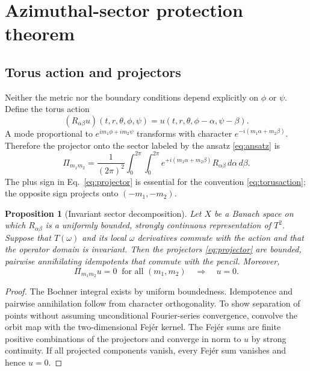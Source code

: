 \documentclass[10pt]{article}
\theoremstyle{plain}
\newtheorem{proposition}{Proposition}
\begin{document}
\section{Azimuthal-sector protection theorem}

\subsection{Torus action and projectors}

Neither the metric nor the boundary conditions depend explicitly on $\phi$ or
$\psi$. Define the torus action
\begin{equation}
(R_{\alpha\beta}u)(t,r,\theta,\phi,\psi)=u(t,r,\theta,\phi-\alpha,\psi-\beta).
\label{eq:torusaction}
\end{equation}
A mode proportional to $e^{im_1\phi+im_2\psi}$ transforms with character
$e^{-i(m_1\alpha+m_2\beta)}$. Therefore the projector onto the sector labeled by
the ansatz \eqref{eq:ansatz} is
\begin{equation}
\Pi_{m_1m_2}=\frac{1}{(2\pi)^2}\int_0^{2\pi}\!\!\int_0^{2\pi}
  e^{+i(m_1\alpha+m_2\beta)}R_{\alpha\beta}\,d\alpha\,d\beta.
\label{eq:projector}
\end{equation}
The plus sign in Eq.~\eqref{eq:projector} is essential for the convention
\eqref{eq:torusaction}; the opposite sign projects onto $(-m_1,-m_2)$.

\begin{proposition}[Invariant sector decomposition]
Let $X$ be a Banach space on which $R_{\alpha\beta}$ is a uniformly bounded,
strongly continuous representation of $T^2$. Suppose that $T(\omega)$ and its
local $\omega$ derivatives commute with the action and that the operator domain
is invariant. Then the projectors \eqref{eq:projector} are bounded, pairwise
annihilating idempotents that commute with the pencil. Moreover,
\begin{equation}
\Pi_{m_1m_2}u=0 \ \text{ for all } (m_1,m_2)
\quad\Longrightarrow\quad u=0.
\end{equation}
\end{proposition}

\begin{proof}
The Bochner integral exists by uniform boundedness. Idempotence and pairwise
annihilation follow from character orthogonality. To show separation of points
without assuming unconditional Fourier-series convergence, convolve the orbit
map with the two-dimensional Fej\'er kernel. The Fej\'er sums are finite
positive combinations of the projectors and converge in norm to $u$ by strong
continuity. If all projected components vanish, every Fej\'er sum vanishes and
hence $u=0$.
\end{proof}
\end{document}
